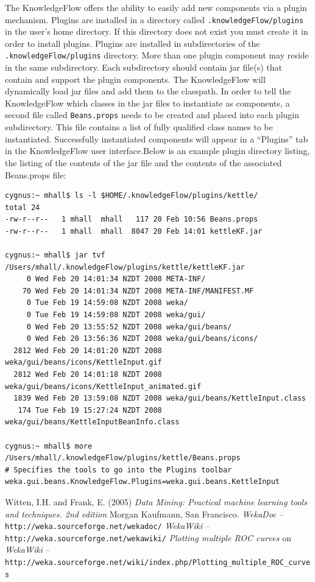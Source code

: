 \documentclass[a4paper]{article}
\begin{document}
The KnowledgeFlow offers the ability to easily add new components via
a plugin mechanism. Plugins are installed in a directory called
\verb=.knowledgeFlow/plugins= in the user's home directory. If this
directory does not exist you must create it in order to install
plugins. Plugins are installed in subdirectories of the
\verb=.knowledgeFlow/plugins= directory. More than one plugin
component may reside in the same subdirectory. Each subdirectory
should contain jar file(s) that contain and support the plugin
components. The KnowledgeFlow will dynamically load jar files and add
them to the classpath. In order to tell the KnowledgeFlow which
classes in the jar files to instantiate as components, a second file
called \verb=Beans.props= needs to be created and placed into each
plugin subdirectory. This file contains a list of fully qualified
class names to be instantiated. Successfully instantiated components
will appear in a ``Plugins'' tab in the KnowledgeFlow user
interface.Below is an example plugin directory listing, the listing of
the contents of the jar file and the contents of the associated
Beans.props file:

\begin{verbatim}
cygnus:~ mhall$ ls -l $HOME/.knowledgeFlow/plugins/kettle/
total 24
-rw-r--r--   1 mhall  mhall   117 20 Feb 10:56 Beans.props
-rw-r--r--   1 mhall  mhall  8047 20 Feb 14:01 kettleKF.jar

cygnus:~ mhall$ jar tvf /Users/mhall/.knowledgeFlow/plugins/kettle/kettleKF.jar 
     0 Wed Feb 20 14:01:34 NZDT 2008 META-INF/
    70 Wed Feb 20 14:01:34 NZDT 2008 META-INF/MANIFEST.MF
     0 Tue Feb 19 14:59:08 NZDT 2008 weka/
     0 Tue Feb 19 14:59:08 NZDT 2008 weka/gui/
     0 Wed Feb 20 13:55:52 NZDT 2008 weka/gui/beans/
     0 Wed Feb 20 13:56:36 NZDT 2008 weka/gui/beans/icons/
  2812 Wed Feb 20 14:01:20 NZDT 2008 weka/gui/beans/icons/KettleInput.gif
  2812 Wed Feb 20 14:01:18 NZDT 2008 weka/gui/beans/icons/KettleInput_animated.gif
  1839 Wed Feb 20 13:59:08 NZDT 2008 weka/gui/beans/KettleInput.class
   174 Tue Feb 19 15:27:24 NZDT 2008 weka/gui/beans/KettleInputBeanInfo.class

cygnus:~ mhall$ more /Users/mhall/.knowledgeFlow/plugins/kettle/Beans.props 
# Specifies the tools to go into the Plugins toolbar
weka.gui.beans.KnowledgeFlow.Plugins=weka.gui.beans.KettleInput
\end{verbatim}

\newpage
\begin{thebibliography}{999}
	 Witten, I.H. and Frank, E. (2005) \textit{Data Mining: Practical machine
learning tools and techniques. 2nd edition}  Morgan Kaufmann, San
Francisco.
	 \textit{WekaDoc} -- \texttt{http://weka.sourceforge.net/wekadoc/}
	 \textit{WekaWiki} -- \texttt{http://weka.sourceforge.net/wekawiki/}
	 \textit{Plotting multiple ROC curves} on \textit{WekaWiki} -- \\
\small{\texttt{http://weka.sourceforge.net/wiki/index.php/Plotting\_multiple\_ROC\_curves}}
\end{thebibliography}
\end{document}
